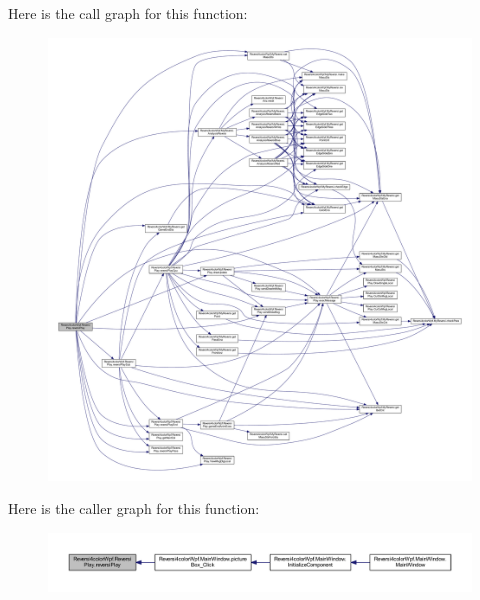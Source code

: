 Here is the call graph for this function\+:
\nopagebreak
\begin{figure}[H]
\begin{center}
\leavevmode
\includegraphics[width=350pt]{class_reversi4color_wpf_1_1_reversi_play_a71d9150ecdddaf5e6446430bf8658180_cgraph}
\end{center}
\end{figure}
Here is the caller graph for this function\+:
\nopagebreak
\begin{figure}[H]
\begin{center}
\leavevmode
\includegraphics[width=350pt]{class_reversi4color_wpf_1_1_reversi_play_a71d9150ecdddaf5e6446430bf8658180_icgraph}
\end{center}
\end{figure}
\mbox{\label{class_reversi4color_wpf_1_1_reversi_play_a2c7daaca43563e35abf8e65347c65a23}} 
